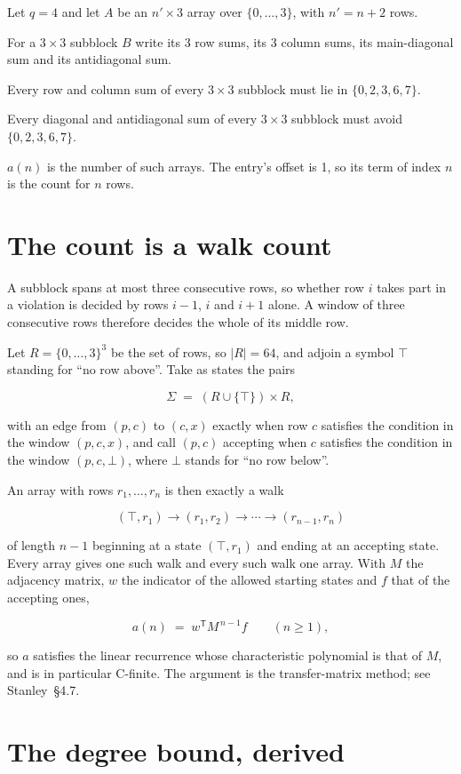 \documentclass[11pt]{article}
\theoremstyle{definition}
\begin{document}
Let $q = 4$ and let $A$ be an $n' \times 3$ array over $\{0,\dots,3\}$, with $n' = n + 2$ rows.

For a $3\times3$ subblock $B$ write its 3 row sums, its 3 column sums, its main-diagonal sum and its antidiagonal sum.

Every row and column sum of every $3\times3$ subblock must lie in $\{0, 2, 3, 6, 7\}$.

Every diagonal and antidiagonal sum of every $3\times3$ subblock must avoid $\{0, 2, 3, 6, 7\}$.

$a(n)$ is the number of such arrays. The entry's offset is 1, so its term of index $n$ is the count for $n$ rows.

\section{The count is a walk count}

A subblock spans at most three consecutive rows, so whether row $i$ takes part in a violation is decided by rows $i-1$, $i$ and $i+1$ alone. A window of three consecutive rows therefore decides the whole of its middle row.

Let $R = \{0,\dots,3\}^{3}$ be the set of rows, so $|R| = 64$, and adjoin a symbol $\top$ standing for ``no row above''. Take as states the pairs

\[\Sigma \;=\; (R \cup \{\top\}) \times R,\]

with an edge from $(p,c)$ to $(c,x)$ exactly when row $c$ satisfies the condition in the window $(p,c,x)$, and call $(p,c)$ accepting when $c$ satisfies the condition in the window $(p,c,\bot)$, where $\bot$ stands for ``no row below''.

An array with rows $r_1,\dots,r_n$ is then exactly a walk

\[(\top,r_1) \to (r_1,r_2) \to \cdots \to (r_{n-1},r_n)\]

of length $n-1$ beginning at a state $(\top,r_1)$ and ending at an accepting state. Every array gives one such walk and every such walk one array. With $M$ the adjacency matrix, $w$ the indicator of the allowed starting states and $f$ that of the accepting ones,

\[a(n) \;=\; w^{\mathsf T} M^{\,n-1} f \qquad (n \ge 1),\]

so $a$ satisfies the linear recurrence whose characteristic polynomial is that of $M$, and is in particular C-finite. The argument is the transfer-matrix method; see Stanley~\S4.7.

\section{The degree bound, derived}
\end{document}
